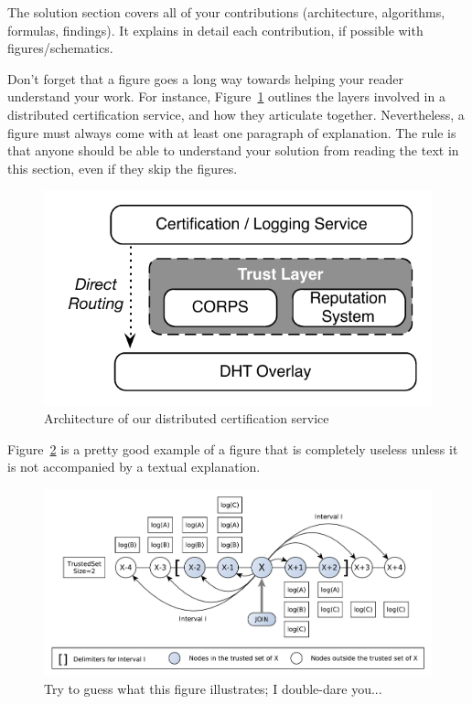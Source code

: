 \documentclass{scrartcl}
\begin{document}
The solution section covers all of your contributions (architecture, algorithms, formulas, findings).
It explains in detail each contribution, if possible with figures/schematics.

Don't forget that a figure goes a long way towards helping your reader understand your work. For instance, Figure~\ref{fig:ascent} outlines the layers involved in a distributed certification service, and how they articulate together. Nevertheless, a figure must always come with at least one paragraph of explanation. The rule is that anyone should be able to understand your solution from reading the text in this section, even if they skip the figures.

\begin{figure}[H]
	\begin{center}
		\includegraphics[scale=0.7]{ascent-archi.pdf}
	\end{center}
	\caption{Architecture of our distributed certification service}
	\label{fig:ascent}
\end{figure}

Figure~\ref{fig:log-archi} is a pretty good example of a figure that is completely useless unless it is not accompanied by a textual explanation.

\begin{figure}
	\begin{center}
		\includegraphics[scale=0.5]{certificates-log-archi.pdf}
	\end{center}
	\caption{Try to guess what this figure illustrates; I double-dare you...}
	\label{fig:log-archi}
\end{figure}
\end{document}
